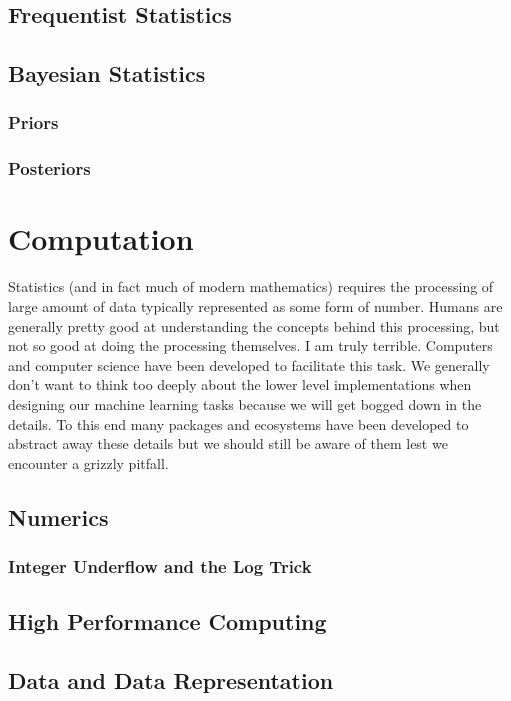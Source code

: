 \documentclass[12pt]{book}
\begin{document}
\subsection{Frequentist Statistics}

\subsection{Bayesian Statistics}

\subsubsection{Priors}

\subsubsection{Posteriors}

\section{Computation}
Statistics (and in fact much of modern mathematics) requires the processing of large amount of data typically represented as some form of number. Humans are generally pretty good at understanding the concepts behind this processing, but not so good at doing the processing themselves. I am truly terrible. Computers and computer science have been developed to facilitate this task. We generally don't want to think too deeply about the lower level implementations when designing our machine learning tasks because we will get bogged down in the details. To this end many packages and ecosystems have been developed to abstract away these details but we should still be aware of them lest we encounter a grizzly pitfall.
\subsection{Numerics}

\subsubsection{Integer Underflow and the Log Trick}

\subsection{High Performance Computing}

\subsection{Data and Data Representation}
\end{document}
